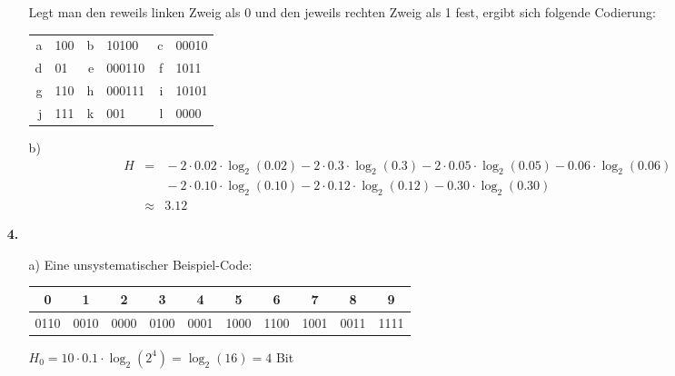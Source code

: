\documentclass[a4paper,10pt]{scrartcl}
\begin{document}
\begin{enumerate}
\begin{enumerate}
\begin{figure}[!h]
                \end{figure}

                Legt man den reweils linken Zweig als 0 und den jeweils rechten Zweig
                als 1 fest, ergibt sich folgende Codierung:

                \begin{tabular}{rl|rl|rl}
                    a & 100    & b & 10100  & c & 00010 \\
                    d & 01     & e & 000110 & f & 1011  \\
                    g & 110    & h & 000111 & i & 10101 \\
                    j & 111    & k & 001    & l & 0000
                \end{tabular}

            \item[b)]
            $$\begin{array}{crl}
            H &=& {}
                - 2 \cdot 0.02 \cdot \log_2(0.02) - 2 \cdot 0.3 \cdot \log_2(0.3)
                - 2 \cdot 0.05 \cdot \log_2(0.05) - 0.06 \cdot \log_2(0.06)\\
            &&{}- 2 \cdot 0.10 \cdot \log_2(0.10) - 2 \cdot 0.12 \cdot \log_2(0.12)
                - 0.30 \cdot \log_2(0.30)\\
            &\approx& 3.12
            \end{array}$$

        \end{enumerate}

    \item[\textbf{4.}]
        \begin{enumerate}
            \item[a)]
                Eine unsystematischer Beispiel-Code:

                \begin{tabular}{c|c|c|c|c|c|c|c|c|c}
                    0 & 1 & 2 & 3 & 4 & 5 & 6 & 7 & 8 & 9 \\
                    \hline
                    0110 & 0010 & 0000 & 0100 & 0001 & 1000 & 1100 & 1001 & 0011 & 1111
                \end{tabular}

                $H_0 = 10 \cdot 0.1 \cdot \log_2(2^4) = \log_2(16) = 4$ Bit 


\end{enumerate}
\end{enumerate}
\end{document}
